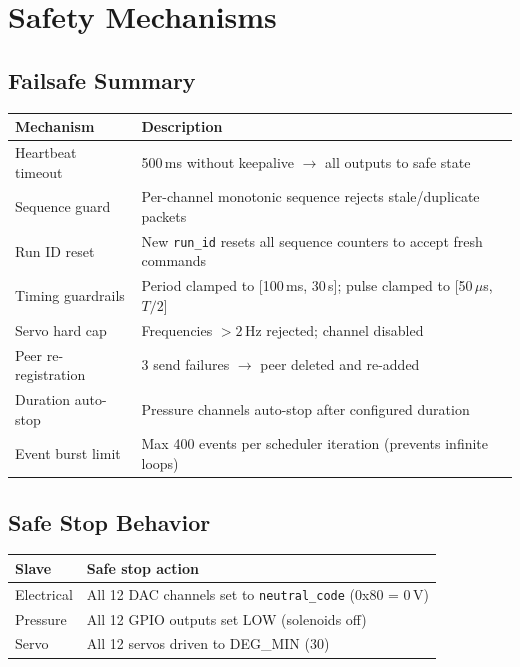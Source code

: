 \documentclass[11pt,a4paper]{article}
\begin{document}
\section{Safety Mechanisms}

\subsection{Failsafe Summary}

\begin{center}
\begin{tabular}{p{4cm}p{8cm}}
\toprule
\textbf{Mechanism} & \textbf{Description} \\
\midrule
Heartbeat timeout & 500\,ms without keepalive $\to$ all outputs to safe state \\
Sequence guard & Per-channel monotonic sequence rejects stale/duplicate packets \\
Run ID reset & New \texttt{run\_id} resets all sequence counters to accept fresh commands \\
Timing guardrails & Period clamped to [100\,ms, 30\,s]; pulse clamped to [50\,$\mu$s, $T/2$] \\
Servo hard cap & Frequencies $> 2$\,Hz rejected; channel disabled \\
Peer re-registration & 3 send failures $\to$ peer deleted and re-added \\
Duration auto-stop & Pressure channels auto-stop after configured duration \\
Event burst limit & Max 400 events per scheduler iteration (prevents infinite loops) \\
\bottomrule
\end{tabular}
\end{center}

\subsection{Safe Stop Behavior}

\begin{center}
\begin{tabular}{ll}
\toprule
\textbf{Slave} & \textbf{Safe stop action} \\
\midrule
Electrical & All 12 DAC channels set to \texttt{neutral\_code} (0x80 = 0\,V) \\
Pressure   & All 12 GPIO outputs set LOW (solenoids off) \\
Servo      & All 12 servos driven to DEG\_MIN (30\textdegree{}) \\
\bottomrule
\end{tabular}
\end{center}
\end{document}
